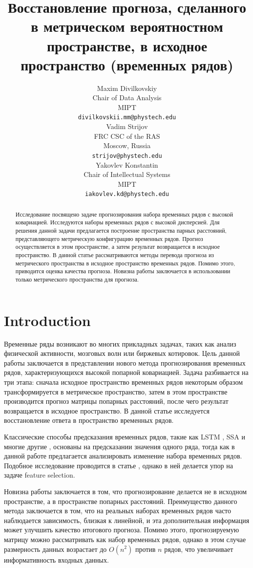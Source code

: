 \documentclass{article}
\title{Восстановление прогноза, сделанного в метрическом вероятностном пространстве, в исходное пространство (временных рядов)}
\author{ Maxim Divilkovskiy \\
	Chair of Data Analysis\\
	MIPT\\
	\texttt{divilkovskii.mm@phystech.edu} \\
	\And
	Vadim Strijov \\
	FRC CSC of the RAS\\
	Moscow, Russia\\
    \texttt{strijov@phystech.edu} \\
    \And
    Yakovlev Konstantin \\
    Chair of Intellectual Systems\\
    MIPT\\
    \texttt{iakovlev.kd@phystech.edu} \\
}
\date{}
\begin{document}
\maketitle

\begin{abstract}
	Исследование посвящено задаче прогнозирования набора временных рядов с высокой ковариацией. Исследуются наборы временных рядов с высокой дисперсией. Для решения данной задачи предлагается построение пространства парных расстояний, представляющего метрическую конфигурацию временных рядов. Прогноз осуществляется в этом пространстве, а затем результат возвращается в исходное пространство.
	В данной статье рассматриваются методы перевода прогноза из метрического пространства в исходное пространство временных рядов. Помимо этого, приводится оценка качества прогноза. Новизна работы заключается в использовании только метрического пространства для прогноза.


\end{abstract}



\section{Introduction}
	Временные ряды возникают во многих прикладных задачах, таких как анализ физической активности, мозговых волн или биржевых котировок. Цель данной работы заключается в представлении нового метода прогнозирования временных рядов, характеризующихся высокой попарной ковариацией. Задача разбивается на три этапа: сначала исходное пространство временных рядов некоторым образом трансформируется в метрическое пространство, затем в этом пространстве производится прогноз матрицы попарных расстояний, после чего результат возвращается в исходное пространство. В данной статье исследуется восстановление ответа в пространство временных рядов.
		
	Классические способы предсказания временных рядов, такие как LSTM \cite{LSTM}, SSA \cite{SSA} и многие другие \cite{Biosignals}, \cite{boyd2017multiperiod} основаны на предсказании значения одного ряда, тогда как в данной работе предлагается анализировать изменение набора временных рядов. Подобное исследование проводится в статье \cite{MulticorrelatedQuadratic}, однако в ней делается упор на задаче feature selection.
	
	Новизна работы заключается в том, что прогнозирование делается не в исходном пространстве, а в пространстве попарных расстояний. Преимущество данного метода заключается в том, что на реальных наборах временных рядов часто наблюдается зависимость, близкая к линейной, и эта дополнительная информация может улучшить качество итогового прогноза. Помимо этого, прогнозируемую матрицу можно рассматривать как набор временных рядов, однако в этом случае размерность данных возрастает до $O(n^2)$ против $n$ рядов, что увеличивает информативность входных данных.
	
\end{document}
